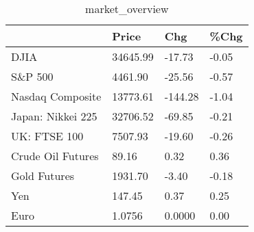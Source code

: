 \documentclass{article}%
\begin{document}
%


\begin{table}[htbp]%
\caption{market\_overview}%
\centering%
\begin{adjustbox}{width=1\textwidth}%
\begin{tabular}{llll}
\toprule
                  &    Price &     Chg &  \%Chg \\
\midrule
             DJIA & 34645.99 &  -17.73 & -0.05 \\
          S\&P 500 &  4461.90 &  -25.56 & -0.57 \\
 Nasdaq Composite & 13773.61 & -144.28 & -1.04 \\
Japan: Nikkei 225 & 32706.52 &  -69.85 & -0.21 \\
     UK: FTSE 100 &  7507.93 &  -19.60 & -0.26 \\
Crude Oil Futures &    89.16 &    0.32 &  0.36 \\
     Gold Futures &  1931.70 &   -3.40 & -0.18 \\
              Yen &   147.45 &    0.37 &  0.25 \\
             Euro &   1.0756 &  0.0000 &  0.00 \\
\bottomrule
\end{tabular}
%
\end{adjustbox}%
\end{table}

%
\end{document}
